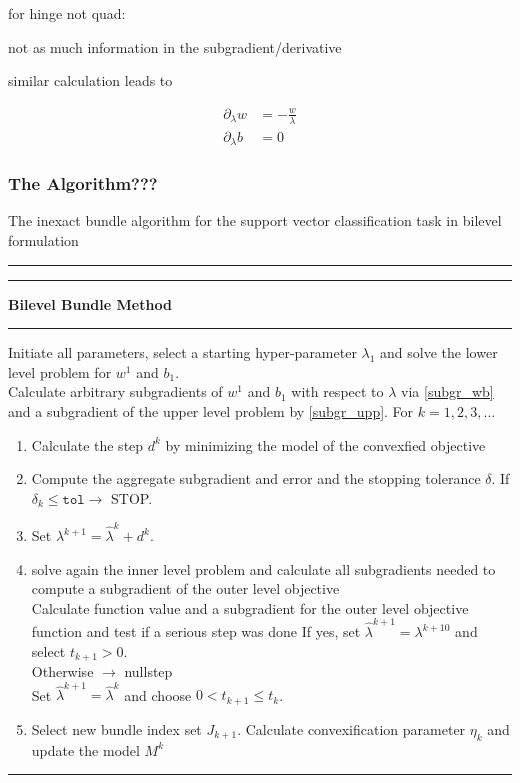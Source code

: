 for hinge not quad:

not as much information in the subgradient/derivative

similar calculation leads to 

\begin{align}
	\partial_{\lambda}w &= -\frac{w}{\lambda} \\
	\partial_{\lambda}b &= 0
\end{align}

\subsubsection{The Algorithm???}

The inexact bundle algorithm for the support vector classification task in bilevel formulation 
\vspace{1.5em}
\hrule  \vspace{0.4ex} \hrule
\vspace{1ex}
\textbf{Bilevel Bundle Method}
\vspace{1ex}
\hrule
\vspace{1ex}
Initiate all parameters, select a starting hyper-parameter \(\lambda_1\) and solve the lower level problem for \(w^1\) and \(b_1\). \\
Calculate arbitrary subgradients of \(w^1\) and \(b_1\) with respect to \(\lambda\) via \ref{subgr_wb} and a subgradient of the upper level problem by \ref{subgr_upp}.  
For \(k = 1,2,3,  \dotsc \)   

\begin{enumerate}
	\item Calculate the step \(d^k\) by minimizing the model of the convexfied objective
	\item Compute the aggregate subgradient and error and the stopping tolerance \(\delta\).
		If \(\delta_k \leq \mathtt{tol} \rightarrow \) STOP.
	\item Set \( \lambda^{k+1} = \hat{\lambda}^k + d^k \).
	\item solve again the inner level problem and calculate all subgradients needed to compute a subgradient of the outer level objective \\
	Calculate function value and a subgradient for the outer level objective function and test if a serious step was done 
	If yes, set \(\hat{\lambda}^{k+1} = \lambda^{k+10}\) and select \(t_{k+1} > 0\). \\
	Otherwise \(\rightarrow\) nullstep \\
	Set \(\hat{\lambda}^{k+1} = \hat{\lambda}^k\) and choose \(0 < t_{k+1} \leq t_k\). 	
	\item Select new bundle index set \(J_{k+1}\). Calculate convexification parameter \(\eta_k\)
	and update the model \(M^k\)
\end{enumerate}
\vspace{1ex}
\hrule
\vspace{1.5em}

